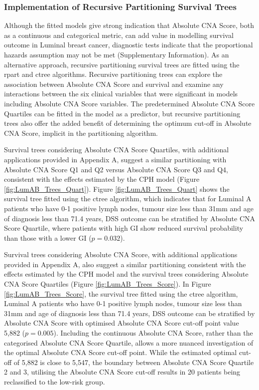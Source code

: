 \subsubsection{Implementation of Recursive Partitioning Survival Trees}
Although the fitted models give strong indication that Absolute CNA Score, both as a continuous and categorical metric, can add value in modelling survival outcome in Luminal breast cancer, diagnostic tests indicate that the proportional hazards assumption may not be met (Supplementary Information). As an alternative approach, recursive partitioning survival trees are fitted using the rpart and ctree algorithms. Recursive partitioning trees can explore the association between Absolute CNA Score and survival and examine any interactions between the six clinical variables that were significant in models including Absolute CNA Score variables. The predetermined Absolute CNA Score Quartiles can be fitted in the model as a predictor, but recursive partitioning trees also offer the added benefit of determining the optimum cut-off in Absolute CNA Score, implicit in the partitioning algorithm. 

Survival trees considering Absolute CNA Score Quartiles, with additional applications provided in Appendix A, suggest a similar partitioning with Absolute CNA Score Q1 and Q2 versus Absolute CNA Score Q3 and Q4, consistent with the effects estimated by the CPH model (Figure \ref{fig:LumAB_Trees_Quart}). Figure \ref{fig:LumAB_Trees_Quart} shows the survival tree fitted using the ctree algorithm, which indicates that for Luminal A patients who have 0-1 positive lymph nodes, tumour size less than 31mm and age of diagnosis less than 71.4 years, DSS outcome can be stratified by Absolute CNA Score Quartile, where patients with high GI show reduced survival probability than those with a lower GI ($p = 0.032$).   

Survival trees considering Absolute CNA Score, with additional applications provided in Appendix A, also suggest a similar partitioning consistent with the effects estimated by the CPH model and the survival trees considering Absolute CNA Score Quartiles (Figure \ref{fig:LumAB_Trees_Score}). In Figure \ref{fig:LumAB_Trees_Score}, the survival tree fitted using the ctree algorithm, Luminal A patients who have 0-1 positive lymph nodes, tumour size less than 31mm and age of diagnosis less than 71.4 years, DSS outcome can be stratified by Absolute CNA Score with optimised Absolute CNA Score cut-off point value 5,882 ($p = 0.005$). Including the continuous Absolute CNA Score, rather than the categorised Absolute CNA Score Quartile, allows a more nuanced investigation of the optimal Absolute CNA Score cut-off point. While the estimated optimal cut-off of 5,882 is close to 5,547, the boundary between Absolute CNA Score Quartile 2 and 3, utilising the Absolute CNA Score cut-off results in 20 patients being reclassified to the low-risk group.  

